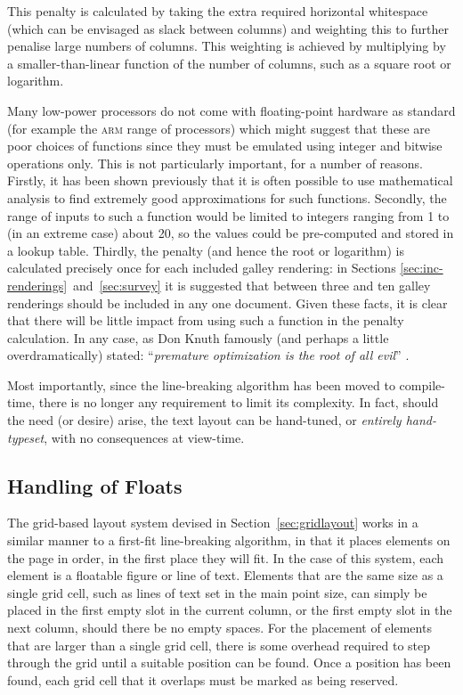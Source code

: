 This penalty is calculated by taking the extra required horizontal whitespace (which can be envisaged as slack between columns) and weighting this to further penalise large numbers of columns. This weighting is achieved by multiplying by a smaller-than-linear function of the number of columns, such as a square root or logarithm.

Many low-power processors do not come with floating-point hardware as standard (for example the \textsc{arm} range of processors) which might suggest that these are poor choices of functions since they must be emulated using integer and bitwise operations only. This is not particularly important, for a number of reasons. Firstly, it has been shown previously\hspace{0pt}\cite{Lomont2003} that it is often possible to use mathematical analysis to find extremely good approximations for such functions. Secondly, the range of inputs to such a function would be limited to integers ranging from 1 to (in an extreme case) about 20, so the values could be pre-computed and stored in a lookup table. Thirdly, the penalty (and hence the root or logarithm) is calculated precisely once for each included galley rendering: in Sections \ref{sec:inc-renderings}~and~\ref{sec:survey} it is suggested that between three and ten galley renderings should be included in any one document. Given these facts, it is clear that there will be little impact from using such a function in the penalty calculation. In any case, as Don Knuth famously (and perhaps a little overdramatically) stated: ``\emph{premature optimization is the root of all evil}'' \cite{Knuth1974}.


Most importantly, since the line-breaking algorithm has been moved to compile-time, there is no longer any requirement to limit its complexity. In fact, should the need (or desire) arise, the text layout can be hand-tuned, or \emph{entirely hand-typeset}, with no consequences at view-time.


\subsection{Handling of Floats}
\label{sec:quant-floats}

The grid-based layout system devised in Section~\ref{sec:gridlayout} works in a similar manner to a first-fit line-breaking algorithm, in that it places elements on the page in order, in the first place they will fit. In the case of this system, each element is a floatable figure or line of text. Elements that are the same size as a single grid cell, such as lines of text set in the main point size, can simply be placed in the first empty slot in the current column, or the first empty slot in the next column, should there be no empty spaces.  For the placement of elements that are larger than a single grid cell, there is some overhead required to step through the grid until a suitable position can be found. Once a position has been found, each grid cell that it overlaps must be marked as being reserved.

